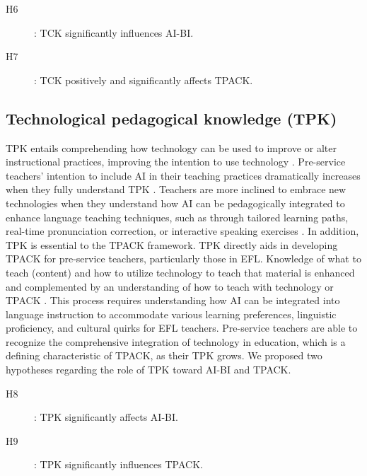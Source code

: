 \documentclass[english]{textolivre}
\begin{document}
\begin{description}
    \item[H6]: TCK significantly influences AI-BI.
    \item[H7]: TCK positively and significantly affects TPACK.
\end{description}


\subsection{Technological pedagogical knowledge (TPK)}\label{sec-organizacao}
TPK entails comprehending how technology can be used to improve or alter instructional practices, improving the intention to use technology \cite{voogt2010tpack}. Pre-service teachers’ intention to include AI in their teaching practices dramatically increases when they fully understand TPK \cite{an2023ai,habibi2020tpack,mailizar2021tpack,sofyan2023tpack}. Teachers are more inclined to embrace new technologies when they understand how AI can be pedagogically integrated to enhance language teaching techniques, such as through tailored learning paths, real-time pronunciation correction, or interactive speaking exercises  \cite{an2023ai,habibi2020tpack}. In addition, TPK is essential to the TPACK framework. TPK directly aids in developing TPACK for pre-service teachers, particularly those in EFL. Knowledge of what to teach (content) and how to utilize technology to teach that material is enhanced and complemented by an understanding of how to teach with technology or TPACK \cite{an2023ai,habibi2020tpack,mailizar2021tpack,sofyan2023tpack}. This process requires understanding how AI can be integrated into language instruction to accommodate various learning preferences, linguistic proficiency, and cultural quirks for EFL teachers. Pre-service teachers are able to recognize the comprehensive integration of technology in education, which is a defining characteristic of TPACK, as their TPK grows. We proposed two hypotheses regarding the role of TPK toward AI-BI and TPACK.

\begin{description}
    \item[H8]: TPK significantly affects AI-BI.
    \item[H9]: TPK significantly influences TPACK.
\end{description}
\end{document}
